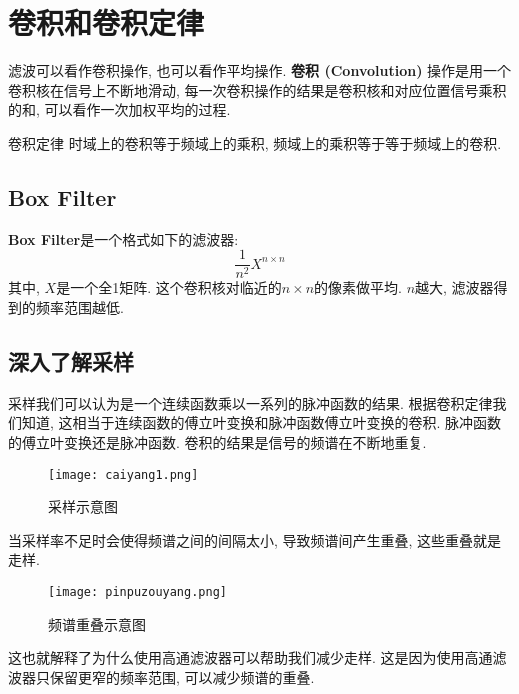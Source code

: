 \documentclass[openany]{progbookcn}
\begin{document}
\section{卷积和卷积定律}
滤波可以看作卷积操作, 也可以看作平均操作. \textbf{卷积 (Convolution) }操作是用一个卷积核在信号上不断地滑动, 每一次卷积操作的结果是卷积核和对应位置信号乘积的和, 可以看作一次加权平均的过程. 

\begin{titledbox}{卷积定律}
	\centering 时域上的卷积等于频域上的乘积, 频域上的乘积等于等于频域上的卷积. 
\end{titledbox}

\subsection{Box Filter}
\textbf{Box Filter}是一个格式如下的滤波器: 
\begin{equation}
	\frac{1}{n^2} X^{n\times n}
\end{equation}
其中, $X$是一个全1矩阵. 这个卷积核对临近的$n\times n$的像素做平均. $n$越大, 滤波器得到的频率范围越低. 

\subsection{深入了解采样}
采样我们可以认为是一个连续函数乘以一系列的脉冲函数的结果. 根据卷积定律我们知道, 这相当于连续函数的傅立叶变换和脉冲函数傅立叶变换的卷积. 脉冲函数的傅立叶变换还是脉冲函数. 卷积的结果是信号的频谱在不断地重复. 

\begin{figure}[H]
	\centering
	\texttt{[image: caiyang1.png]}
	\caption{采样示意图}
	\label{fig:caiyang}
\end{figure}
当采样率不足时会使得频谱之间的间隔太小, 导致频谱间产生重叠, 这些重叠就是走样. 

\begin{figure}[H]
	\centering
	\texttt{[image: pinpuzouyang.png]}
	\caption{频谱重叠示意图}
	\label{fig:pinpuzouyang}
\end{figure}

这也就解释了为什么使用高通滤波器可以帮助我们减少走样. 这是因为使用高通滤波器只保留更窄的频率范围, 可以减少频谱的重叠. 
\end{document}
